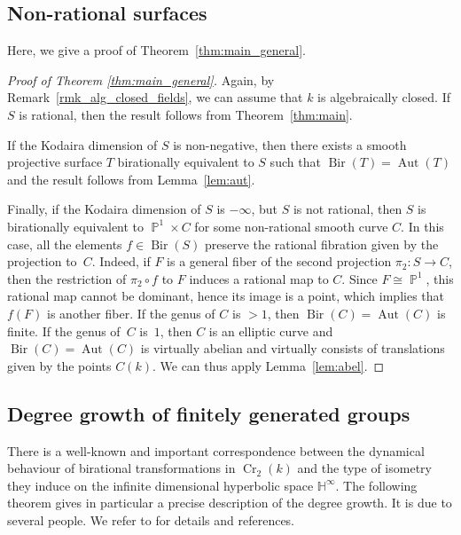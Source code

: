 \documentclass[JEP,XML,SOM,Unicode, NoEqCountersInSection,published]{cedram}
\newcommand{\p}{\operatorname{\mathbb{P}}}\let\P\p
\newcommand{\h}{\operatorname{\mathbb{H}^{\infty}}}
\newcommand{\kk}{k}
\newcommand{\Aut}{\operatorname{Aut}}
\newcommand{\Bir}{\operatorname{Bir}}
\newcommand{\Cr}{\operatorname{Cr}}
\theoremstyle{plain}
\theoremstyle{definition}
\begin{document}
\subsection{Non-rational surfaces}\label{sec:remarks}
Here, we give a proof of Theorem~\ref{thm:main_general}.

\begin{proof}[Proof of Theorem \ref{thm:main_general}]
{Again, by Remark~\ref{rmk_alg_closed_fields}, we can assume that $k$ is algebraically closed}.
If $S$ is rational, then the result follows from Theorem~\ref{thm:main}.

If the Kodaira dimension of $S$ is non-negative, then there exists a smooth projective surface $T$ birationally equivalent to $S$ such that $\Bir(T)=\Aut(T)$ and the result follows from Lemma~\ref{lem:aut}.

Finally, if the Kodaira dimension of $S$ is $-\infty$, but $S$ is not rational, then $S$ is birationally equivalent to $\p^1\times C$ for some non-rational smooth curve $C$. In this case, all the elements $f\in\Bir(S)$ preserve the rational fibration given by the projection to~$C$. {Indeed, if $F$ is a general fiber of the second projection $\pi_2\colon S\to C$, then the restriction of $\pi_2\circ f$ to $F$ induces a rational map to $C$. Since $F\cong \p^1$, this rational map cannot be dominant, hence its image is a point, which implies that $f(F)$ is another fiber.} If the genus of $C$ is $>1$, then $\Bir(C)=\Aut(C)$ is finite. If the genus of~$C$ is~$1$, then $C$ is an elliptic curve and $\Bir(C)=\Aut(C)$ is virtually abelian and virtually consists of translations given by the points $C(\kk)$. We can thus apply Lemma~\ref{lem:abel}.
\end{proof}

\subsection{Degree growth of finitely generated groups}\label{sec:degrees}

There is a well-known and important correspondence between the dynamical behaviour of birational transformations in $\Cr_2(k)$ and the type of isometry they induce on the infinite dimensional hyperbolic space $\h$. The following theorem gives in particular a precise description of the degree growth. It is due to several people. We refer to \cite{cantat2015cremona} for details and references.
\end{document}
